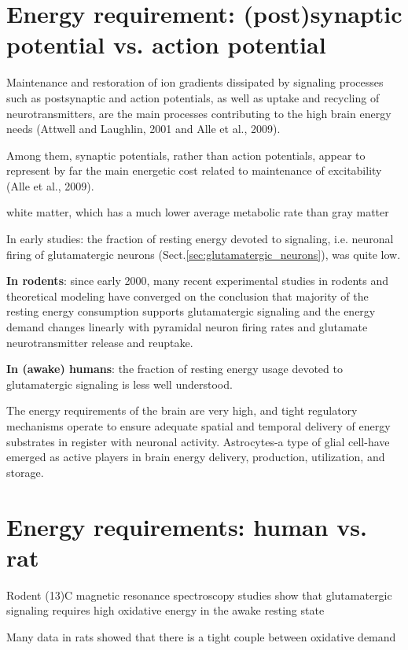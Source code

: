 \section{Energy requirement: (post)synaptic potential vs. action potential}

Maintenance and restoration of ion gradients dissipated by signaling processes
such as postsynaptic and action potentials, as well as uptake and recycling of
neurotransmitters, are the main processes contributing to the high brain energy
needs (Attwell and Laughlin, 2001 and Alle et al., 2009).

Among them, synaptic potentials, rather than action potentials, appear to
represent by far the main energetic cost related to maintenance of excitability
(Alle et al., 2009).

white matter, which has a much lower average
metabolic rate than gray matter


In early studies: the fraction of resting energy devoted to signaling, i.e.
neuronal firing of glutamatergic neurons (Sect.\ref{sec:glutamatergic_neurons}),
was quite low.

{\bf In rodents}: since early 2000, many recent experimental studies in rodents
and theoretical modeling have converged on the conclusion that majority of the
resting energy consumption supports glutamatergic signaling and the energy
demand changes linearly with pyramidal neuron firing rates and glutamate
neurotransmitter release and reuptake.

{\bf In (awake) humans}: the fraction of resting
energy usage devoted to glutamatergic signaling is less well
understood.


The energy requirements of the brain are very high, and tight regulatory
mechanisms operate to ensure adequate spatial and temporal delivery of energy
substrates in register with neuronal activity.
Astrocytes-a type of glial cell-have emerged as active players in brain energy
delivery, production, utilization, and storage.

\section{Energy requirements: human vs. rat}

Rodent (13)C magnetic resonance spectroscopy studies show that glutamatergic
signaling requires high oxidative energy in the awake resting state

Many data in rats showed that there is a tight couple between oxidative demand

